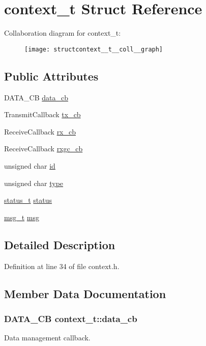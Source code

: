 \hypertarget{structcontext__t}{\section{context\-\_\-t Struct Reference}
\label{structcontext__t}
}


Collaboration diagram for context\-\_\-t\-:
\nopagebreak
\begin{figure}[H]
\begin{center}
\leavevmode
\texttt{[image: structcontext\_\_t\_\_coll\_\_graph]}
\end{center}
\end{figure}
\subsection*{Public Attributes}
\begin{DoxyCompactItemize}
\item 
D\-A\-T\-A\-\_\-\-C\-B \hyperlink{structcontext__t_ae79525e2fb5ec4ad5b6beb03c0fd9579}{data\-\_\-cb}
\item 
Transmit\-Callback \hyperlink{structcontext__t_a12db6f3e506312d989eb79877eae5e3b}{tx\-\_\-cb}
\item 
Receive\-Callback \hyperlink{structcontext__t_a73e2dad8cc38ed72d324ab0ae11f0f52}{rx\-\_\-cb}
\item 
Receive\-Callback \hyperlink{structcontext__t_ae8acba22504829448da7fa1cf793c7a3}{rxgc\-\_\-cb}
\item 
unsigned char \hyperlink{structcontext__t_afcfccef1ae4111aee136acf0d92b4379}{id}
\item 
unsigned char \hyperlink{structcontext__t_a2dbb966924ef90bfba1876ad8a3872af}{type}
\item 
\hyperlink{structstatus__t}{status\-\_\-t} \hyperlink{structcontext__t_a0e49b82a79be5df63399ddbcc0cc022c}{status}
\item 
\hyperlink{structmsg__t}{msg\-\_\-t} \hyperlink{structcontext__t_ae806cd53ff68971d122ab6f854d22b8d}{msg}
\end{DoxyCompactItemize}


\subsection{Detailed Description}


Definition at line 34 of file context.\-h.



\subsection{Member Data Documentation}
\hypertarget{structcontext__t_ae79525e2fb5ec4ad5b6beb03c0fd9579}{
\subsubsection[{data\-\_\-cb}]{\setlength{\rightskip}{0pt plus 5cm}D\-A\-T\-A\-\_\-\-C\-B context\-\_\-t\-::data\-\_\-cb}}\label{structcontext__t_ae79525e2fb5ec4ad5b6beb03c0fd9579}
Data management callback. 

